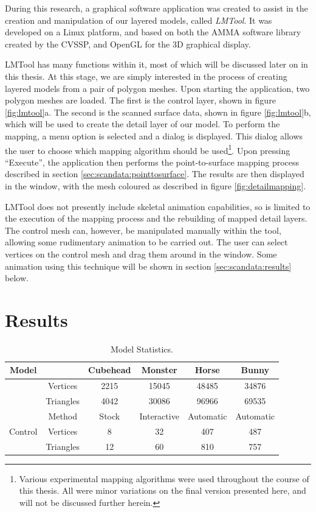 During this research, a graphical software application was created to assist in the creation and manipulation of our layered models, called {\it LMTool}. It was developed on a Linux platform, and based on both the AMMA software library \cite{AMMA} created by the CVSSP, and OpenGL \cite{OpenGL} for the 3D graphical display.

LMTool has many functions within it, most of which will be discussed later on in this thesis. At this stage, we are simply interested in the process of creating layered models from a pair of polygon meshes. Upon starting the application, two polygon meshes are loaded. The first is the control layer, shown in figure \ref{fig:lmtool}a. The second is the scanned surface data, shown in figure \ref{fig:lmtool}b, which will be used to create the detail layer of our model. To perform the mapping, a menu option is selected and a dialog is displayed. This dialog allows the user to choose which mapping algorithm should be used\footnote{Various experimental mapping algorithms were used throughout the course of this thesis. All were minor variations on the final version presented here, and will not be discussed further herein.}. Upon pressing ``Execute'', the application then performs the point-to-surface mapping process described in section \ref{sec:scandata:pointtosurface}. The results are then displayed in the window, with the mesh coloured as described in figure \ref{fig:detailmapping}.

LMTool does not presently include skeletal animation capabilities, so is limited to the execution of the mapping process and the rebuilding of mapped detail layers. The control mesh can, however, be manipulated manually within the tool, allowing some rudimentary animation to be carried out. The user can select vertices on the control mesh and drag them around in the window. Some animation using this technique will be shown in section \ref{sec:scandata:results} below.

\section{\label{sec:scandata:results}Results}

\begin{table}
\begin{center}
\begin{tabular}{c|c|c|c|c|c} 
Model & & Cubehead & Monster & Horse & Bunny \\
\hline
			& Vertices & 2215 & 15045  & 48485 & 34876 \\
\raisebox{1.5ex}{Detail}& Triangles & 4042 & 30086  & 96966 & 69535 \\
\hline
  	& Method & Stock & Interactive & Automatic & Automatic \\
Control & Vertices & 8 & 32  & 407 & 487 \\
  	& Triangles & 12 & 60  & 810 & 757 \\
\hline
\end{tabular}
\caption[Model Statistics]{\label{tbl:models} Model Statistics. }
\end{center}
\end{table}


